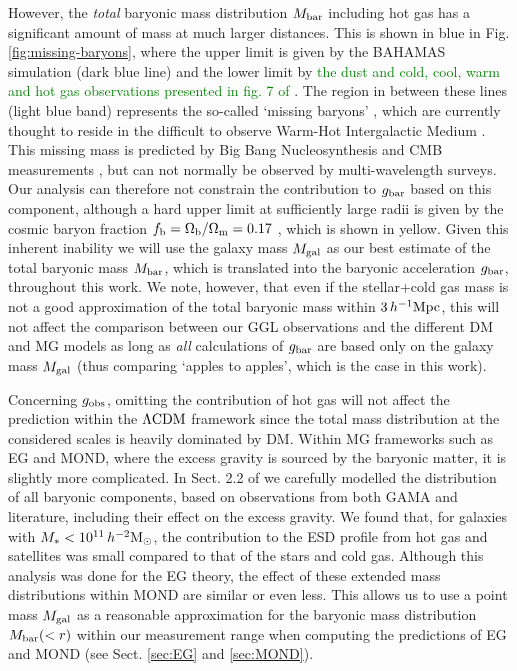 \documentclass[usenatbib]{mnras}
\newcommand{\hmsun}{\,h^{-2} {\rm M_\odot}}
\newcommand{\hMpc}{\, h^{-1}{\rm{Mpc}} }
\newcommand{\lcdm}{{\rm \Lambda CDM}}
\newcommand{\un}[1]{_{\rm #1}}
\begin{document}
However, the \emph{total} baryonic mass distribution $M\un{bar}$ including hot gas has a significant amount of mass at much larger distances. This is shown in blue in Fig. \ref{fig:missing-baryons}, where the upper limit is given by the BAHAMAS simulation (dark blue line) and the lower limit by \textcolor{Green}{the dust and cold, cool, warm and hot gas observations presented in fig. 7 of \citet[][bottom of the light blue band]{tumlinson2017}}. The region in between these lines (light blue band) represents the so-called `missing baryons' \cite[]{fukugita1998,fukugita2004,shull2012}, which are currently thought to reside in the difficult to observe Warm-Hot Intergalactic Medium \cite[WHIM,][]{nicastro2018}. This missing mass is predicted by Big Bang Nucleosynthesis \cite[BBN,][]{kirkman2003} and CMB measurements \cite[]{spergel2003,planck2014}, but can not normally be observed by multi-wavelength surveys. Our analysis can therefore not constrain the contribution to $g\un{bar}$ based on this component, although a hard upper limit at sufficiently large radii is given by the cosmic baryon fraction $f\un{b} = \Omega\un{b}/\Omega\un{m} = 0.17$ \cite[]{hinshaw2013}, which is shown in yellow. Given this inherent inability we will use the galaxy mass $M\un{gal}$ as our best estimate of the total baryonic mass $M\un{bar}$, which is translated into the baryonic acceleration $g\un{bar}$, throughout this work. We note, however, that even if the stellar+cold gas mass is not a good approximation of the total baryonic mass within $3 \hMpc$, this will not affect the comparison between our GGL observations and the different DM and MG models as long as \emph{all} calculations of $g\un{bar}$ are based only on the galaxy mass $M\un{gal}$ (thus comparing `apples to apples', which is the case in this work).

Concerning $g\un{obs}$, omitting the contribution of hot gas will not affect the prediction within the $\lcdm$ framework since the total mass distribution at the considered scales is heavily dominated by DM. Within MG frameworks such as EG and MOND, where the excess gravity is sourced by the baryonic matter, it is slightly more complicated. In Sect. 2.2 of \cite{brouwer2017} we carefully modelled the distribution of all baryonic components, based on observations from both GAMA and literature, including their effect on the excess gravity. We found that, for galaxies with $M_*<10^{11}\hmsun$, the contribution to the ESD profile from hot gas and satellites was small compared to that of the stars and cold gas. Although this analysis was done for the EG theory, the effect of these extended mass distributions within MOND are similar or even less. This allows us to use a point mass $M\un{gal}$ as a reasonable approximation for the baryonic mass distribution $M\un{bar}(<r)$ within our measurement range when computing the predictions of EG and MOND (see Sect. \ref{sec:EG} and \ref{sec:MOND}).
\end{document}
